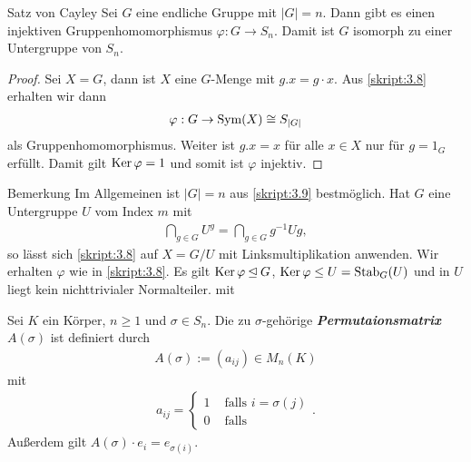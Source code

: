\begin{genericthm}{Satz von Cayley} \label{skript:3.9} 
	Sei $ G $ eine endliche Gruppe mit $ |G| = n $. Dann gibt es einen injektiven
	Gruppenhomomorphismus $ \varphi : G \to S_n $. Damit ist $ G $ isomorph zu einer Untergruppe von $ S_n $.
\end{genericthm}

\begin{proof}
	Sei $ X = G $, dann ist $ X $ eine $ G $-Menge mit $ g.x = g \cdot x $. 
	Aus \ref{skript:3.8} erhalten wir dann
	\begin{align*}
	\varphi : G \to \operatorname{Sym}(X) \cong S_{|G|}
	\end{align*}
	als Gruppenhomomorphismus. Weiter ist $ g.x = x $ für alle $ x \in X $ nur für $ g = 1_G $ erfüllt.
	Damit gilt $ \operatorname{Ker} \varphi = 1 $ und somit ist $ \varphi $ injektiv.
\end{proof}

\begin{generic_no_num}{Bemerkung}
	Im Allgemeinen ist $ |G| = n $ aus \ref{skript:3.9} bestmöglich.
	Hat $ G $ eine Untergruppe $ U $ vom Index $ m $ mit 
	\begin{align*}
	\bigcap \limits_{g \in G} U^g = \bigcap \limits_{g \in G} g^{-1} U g ,
	\end{align*}
	so lässt sich \ref{skript:3.8} auf $ X = G/U $ mit Linksmultiplikation anwenden.
	Wir erhalten $ \varphi $ wie in \ref{skript:3.8}. 
	Es gilt $ \operatorname{Ker} \varphi \unlhd G $, $ \operatorname{Ker} \varphi \leq  U = \operatorname{Stab}_G(U) $ und in $ U $ 
	liegt kein nichttrivialer Normalteiler.
 mit \end{generic_no_num}

\begin{df} \label{skript:3.10} 
	Sei $ K $ ein Körper, $ n \geq 1 $ und $ \sigma \in S_n $.
	Die zu $ \sigma $-gehörige \textbf{\textit{Permutaionsmatrix}} $ A(\sigma) $ ist definiert durch
	\begin{align*}
	A(\sigma) := (a_{ij}) \in M_n(K)
	\end{align*}
	mit
	\begin{align*}
	a_{ij} = 
	\begin{cases}
	1 & \text{ falls } i=\sigma(j) \\
	0 & \text{ falls}
	\end{cases}.
	\end{align*}
	Außerdem gilt $ A( \sigma ) \cdot e_i = e_{\sigma(i)} $.
\end{df}

